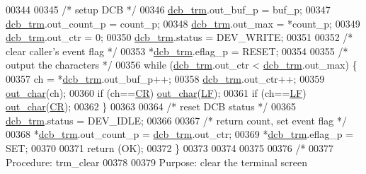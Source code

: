 \begin{DoxyCode}
00344 
00345         \textcolor{comment}{/* setup DCB */}
00346         \hyperlink{trmdrive_8c_aeecf5b41137f812666e981eebea04e61}{dcb_trm}.out\_buf\_p = buf\_p;
00347         \hyperlink{trmdrive_8c_aeecf5b41137f812666e981eebea04e61}{dcb_trm}.out\_count\_p = count\_p;
00348         \hyperlink{trmdrive_8c_aeecf5b41137f812666e981eebea04e61}{dcb_trm}.out\_max = *count\_p;
00349         \hyperlink{trmdrive_8c_aeecf5b41137f812666e981eebea04e61}{dcb_trm}.out\_ctr = 0;
00350         \hyperlink{trmdrive_8c_aeecf5b41137f812666e981eebea04e61}{dcb_trm}.status = DEV\_WRITE;
00351 
00352         \textcolor{comment}{/* clear caller's event flag */}
00353         *\hyperlink{trmdrive_8c_aeecf5b41137f812666e981eebea04e61}{dcb_trm}.eflag\_p = RESET;
00354 
00355         \textcolor{comment}{/* output the characters */}
00356         \textcolor{keywordflow}{while} (\hyperlink{trmdrive_8c_aeecf5b41137f812666e981eebea04e61}{dcb_trm}.out\_ctr < \hyperlink{trmdrive_8c_aeecf5b41137f812666e981eebea04e61}{dcb_trm}.out\_max) \{
00357                 ch = *\hyperlink{trmdrive_8c_aeecf5b41137f812666e981eebea04e61}{dcb_trm}.out\_buf\_p++;
00358                 \hyperlink{trmdrive_8c_aeecf5b41137f812666e981eebea04e61}{dcb_trm}.out\_ctr++;
00359                 \hyperlink{trmdrive_8c_a46f4cf8a0c8928f76d9d25f530a9ac7e}{out_char}(ch);
00360                 \textcolor{keywordflow}{if} (ch==\hyperlink{trmdrive_8c_a876ce77f3c672c7162658151e648389e}{CR}) \hyperlink{trmdrive_8c_a46f4cf8a0c8928f76d9d25f530a9ac7e}{out_char}(\hyperlink{trmdrive_8c_a350c9d6cb81908d59427ee96844d1a9c}{LF});
00361                 \textcolor{keywordflow}{if} (ch==\hyperlink{trmdrive_8c_a350c9d6cb81908d59427ee96844d1a9c}{LF}) \hyperlink{trmdrive_8c_a46f4cf8a0c8928f76d9d25f530a9ac7e}{out_char}(\hyperlink{trmdrive_8c_a876ce77f3c672c7162658151e648389e}{CR});
00362         \}
00363 
00364         \textcolor{comment}{/* reset DCB status */}
00365         \hyperlink{trmdrive_8c_aeecf5b41137f812666e981eebea04e61}{dcb_trm}.status = DEV\_IDLE;
00366 
00367         \textcolor{comment}{/* return count, set event flag */}
00368         *\hyperlink{trmdrive_8c_aeecf5b41137f812666e981eebea04e61}{dcb_trm}.out\_count\_p = \hyperlink{trmdrive_8c_aeecf5b41137f812666e981eebea04e61}{dcb_trm}.out\_ctr;
00369         *\hyperlink{trmdrive_8c_aeecf5b41137f812666e981eebea04e61}{dcb_trm}.eflag\_p = SET;
00370 
00371         \textcolor{keywordflow}{return} (OK);
00372 \}
00373 
00374 
00375 
00376 \textcolor{comment}{/*}
00377 \textcolor{comment}{        Procedure: trm\_clear}
00378 \textcolor{comment}{}
00379 \textcolor{comment}{        Purpose: clear the terminal screen}

\end{DoxyCode}
